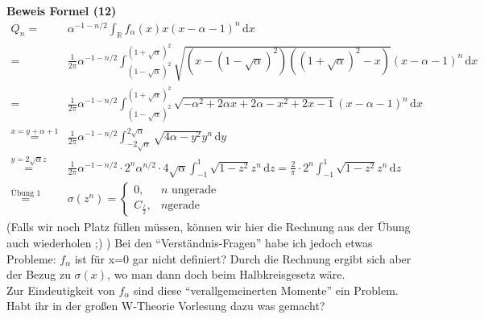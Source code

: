\documentclass[a4paper, 11pt]{scrreprt}
\newenvironment{beweis}[1][Beweis]{\begin{trivlist}
	\item[\hskip \labelsep {\bfseries #1}]}
	{\end{trivlist}}
\newcommand{\RR}{\mathbb{R}}
\begin{document}
\begin{beweis}
\textbf{Beweis Formel (12)}\\
\begin{align*}
	Q_n =& \alpha^{-1-n/2}\int_{\RR} f_{\alpha}(x)x(x-\alpha -1)^n\,\mathrm{d}x \\
	 =& \frac{1}{2\pi}\alpha^{-1-n/2} \int_{(1-\sqrt{\alpha})^2}^{(1+\sqrt{\alpha})^2} \sqrt{(x-(1-\sqrt{\alpha})^2)((1+\sqrt{\alpha})^2-x)} (x-\alpha -1)^n \,\mathrm{d}x\\
	=& \frac{1}{2\pi}\alpha^{-1-n/2} \int_{(1-\sqrt{\alpha})^2}^{(1+\sqrt{\alpha})^2} \sqrt{-\alpha^2+2\alpha x+2\alpha -x^2+2x-1}(x-\alpha-1)^n \,\mathrm{d}x\\
	\overset{x=y+\alpha+1}{=}& \frac{1}{2\pi}\alpha^{-1-n/2} \int_{-2\sqrt{\alpha}}^{2\sqrt{\alpha}} \sqrt{4\alpha -y^2} y^n \,\mathrm{d}y\\
	\overset{y=2\sqrt{\alpha}z}{=}& \frac{1}{2\pi}\alpha^{-1-n/2} \cdot 2^n \alpha^{n/2}\cdot4\sqrt{\alpha}\int_{-1}^{1} \sqrt{1-z^2}z^n \,\mathrm{d}z = \frac{2}{\pi} \cdot 2^n\int_{-1}^{1} \sqrt{1-z^2}z^n\,\mathrm{d}z \\
	\overset{\text{Übung 1}}{=}& \sigma(z^n) = \begin{cases} 0, &n\text{ ungerade}\\
	C_{\frac l 2}, &n\text{gerade} \end{cases}
\end{align*}
(Falls wir noch Platz füllen müssen, können wir hier die Rechnung aus der Übung auch wiederholen ;) )
Bei den "`Verständnis-Fragen"' habe ich jedoch etwas Probleme: \(f_{\alpha}\) ist für x=0 gar nicht definiert? Durch die Rechnung ergibt sich aber der Bezug zu \(\sigma(x)\), wo man dann doch beim Halbkreisgesetz wäre.\\
Zur Eindeutigkeit von \(f_{\alpha}\) sind diese "`verallgemeinerten Momente"' ein Problem. Habt ihr in der großen W-Theorie Vorlesung dazu was gemacht?



\end{beweis}
\end{document}
